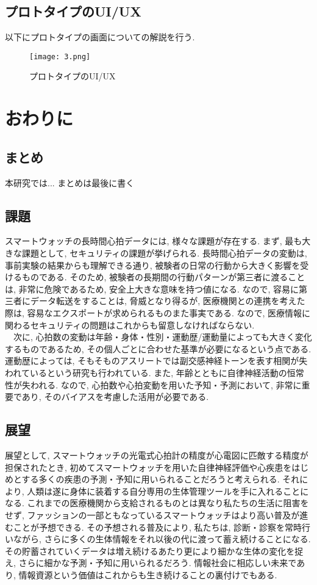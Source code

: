 \documentclass[report, 11pt, a4paper]{jsbook}
\begin{document}
\section{プロトタイプのUI/UX}
以下にプロトタイプの画面についての解説を行う.

\begin{figure}[H]
\centering
\texttt{[image: 3.png]}
\caption{プロトタイプのUI/UX}
\label{fig:goolge_trends}
\end{figure}


\chapter{おわりに}

\section{まとめ}
本研究では...
まとめは最後に書く

\section{課題}
スマートウォッチの長時間心拍データには, 様々な課題が存在する. まず, 最も大きな課題として, セキュリティの課題が挙げられる. 長時間心拍データの変動は, 事前実験の結果からも理解できる通り, 被験者の日常の行動から大きく影響を受けるものである. そのため, 被験者の長期間の行動パターンが第三者に渡ることは, 非常に危険であるため, 安全上大きな意味を持つ値になる. なので, 容易に第三者にデータ転送をすることは, 脅威となり得るが, 医療機関との連携を考えた際は, 容易なエクスポートが求められるものまた事実である. なので, 医療情報に関わるセキュリティの問題はこれからも留意しなければならない. \\
　次に, 心拍数の変動は年齢・身体・性別・運動歴/運動量によっても大きく変化するものであるため, その個人ごとに合わせた基準が必要になるという点である. 運動歴によっては, そもそものアスリートでは副交感神経トーンを表す相関が失われているという研究も行われている. また, 年齢とともに自律神経活動の恒常性が失われる. なので, 心拍数や心拍変動を用いた予知・予測において, 非常に重要であり, そのバイアスを考慮した活用が必要である.


\section{展望}
展望として, スマートウォッチの光電式心拍計の精度が心電図に匹敵する精度が担保されたとき, 初めてスマートウォッチを用いた自律神経評価や心疾患をはじめとする多くの疾患の予測・予知に用いられることだろうと考えられる. それにより, 人類は遂に身体に装着する自分専用の生体管理ツールを手に入れることになる. これまでの医療機関から支給されるものとは異なり私たちの生活に阻害をせず, ファッションの一部ともなっているスマートウォッチはより高い普及が進むことが予想できる. その予想される普及により, 私たちは, 診断・診察を常時行いながら, さらに多くの生体情報をそれ以後の代に渡って蓄え続けることになる. その貯蓄されていくデータは増え続けるあたり更により細かな生体の変化を捉え, さらに細かな予測・予知に用いられるだろう. 情報社会に相応しい未来であり, 情報資源という価値はこれからも生き続けることの裏付けでもある. \\
\end{document}

